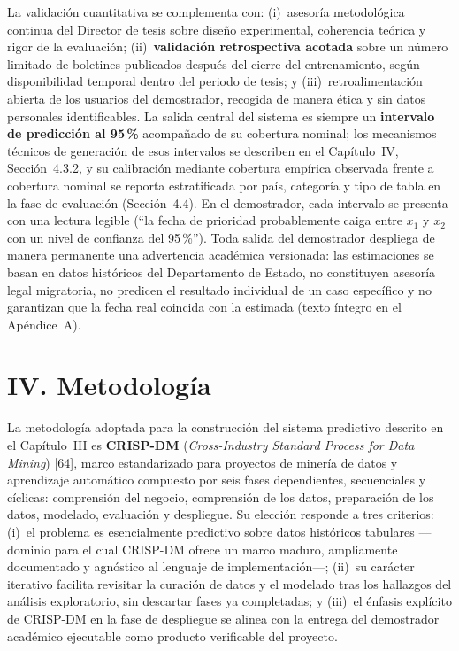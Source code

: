 \documentclass[12pt,letterpaper]{report}
\newcommand{\cita}[1]{\hyperref[bib:#1]{[#1]}}
\begin{document}
La validación cuantitativa se complementa con: (i)~asesoría metodológica continua del Director de tesis sobre diseño experimental, coherencia teórica y rigor de la evaluación; (ii)~\textbf{validación retrospectiva acotada} sobre un número limitado de boletines publicados después del cierre del entrenamiento, según disponibilidad temporal dentro del periodo de tesis; y (iii)~retroalimentación abierta de los usuarios del demostrador, recogida de manera ética y sin datos personales identificables. La salida central del sistema es siempre un \textbf{intervalo de predicción al 95\,\%} acompañado de su cobertura nominal; los mecanismos técnicos de generación de esos intervalos se describen en el Capítulo~IV, Sección~4.3.2, y su calibración mediante cobertura empírica observada frente a cobertura nominal se reporta estratificada por país, categoría y tipo de tabla en la fase de evaluación (Sección~4.4). En el demostrador, cada intervalo se presenta con una lectura legible (``la fecha de prioridad probablemente caiga entre $x_1$ y $x_2$ con un nivel de confianza del 95\,\%''). Toda salida del demostrador despliega de manera permanente una advertencia académica versionada: las estimaciones se basan en datos históricos del Departamento de Estado, no constituyen asesoría legal migratoria, no predicen el resultado individual de un caso específico y no garantizan que la fecha real coincida con la estimada (texto íntegro en el Apéndice~A).

\clearpage

\chapter{IV. Metodología}

La metodología adoptada para la construcción del sistema predictivo descrito en el Capítulo~III es \textbf{CRISP-DM} (\textit{Cross-Industry Standard Process for Data Mining}) \cita{64}, marco estandarizado para proyectos de minería de datos y aprendizaje automático compuesto por seis fases dependientes, secuenciales y cíclicas: comprensión del negocio, comprensión de los datos, preparación de los datos, modelado, evaluación y despliegue. Su elección responde a tres criterios: (i)~el problema es esencialmente predictivo sobre datos históricos tabulares ---dominio para el cual CRISP-DM ofrece un marco maduro, ampliamente documentado y agnóstico al lenguaje de implementación---; (ii)~su carácter iterativo facilita revisitar la curación de datos y el modelado tras los hallazgos del análisis exploratorio, sin descartar fases ya completadas; y (iii)~el énfasis explícito de CRISP-DM en la fase de despliegue se alinea con la entrega del demostrador académico ejecutable como producto verificable del proyecto.
\end{document}
